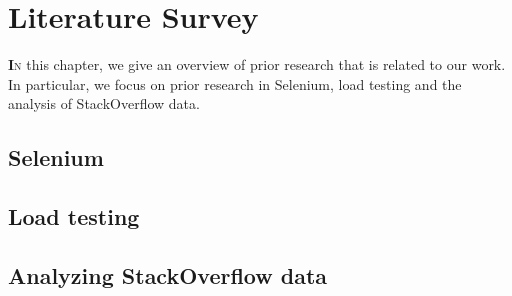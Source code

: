 \chapter{Literature Survey}\label{Ch:Survey}

\lettrine[lines=3]{\textbf{I}}{n} this chapter, we give an overview of prior research that is related to our work. 
In particular, we focus on prior research in Selenium, load testing and the analysis of StackOverflow data. 


\section{Selenium}




\section{Load testing}



\section{Analyzing StackOverflow data}

